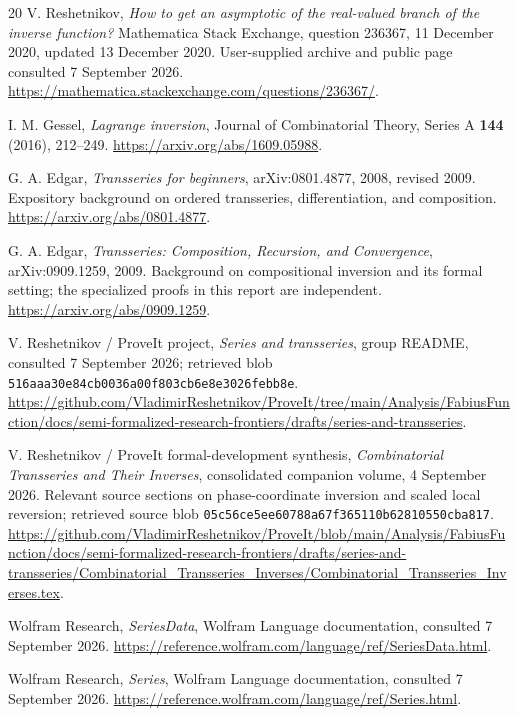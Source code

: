 \documentclass[11pt,a4paper]{article}
\numberwithin{equation}{section}
\theoremstyle{definition}
\theoremstyle{remark}
\begin{document}
\begingroup\small
\begin{thebibliography}{20}
V. Reshetnikov, \emph{How to get an asymptotic of the real-valued branch of
the inverse function?} Mathematica Stack Exchange, question 236367,
11 December 2020, updated 13 December 2020. User-supplied archive and public
page consulted 7 September 2026.
\url{https://mathematica.stackexchange.com/questions/236367/}.

I. M. Gessel, \emph{Lagrange inversion}, Journal of Combinatorial Theory,
Series A \textbf{144} (2016), 212--249.
\url{https://arxiv.org/abs/1609.05988}.

G. A. Edgar, \emph{Transseries for beginners}, arXiv:0801.4877,
2008, revised 2009. Expository background on ordered transseries,
differentiation, and composition.
\url{https://arxiv.org/abs/0801.4877}.

G. A. Edgar, \emph{Transseries: Composition, Recursion, and Convergence},
arXiv:0909.1259, 2009. Background on compositional inversion and its formal
setting; the specialized proofs in this report are independent.
\url{https://arxiv.org/abs/0909.1259}.

V. Reshetnikov / ProveIt project, \emph{Series and transseries}, group README,
consulted 7 September 2026; retrieved blob
\texttt{516aaa30e84cb0036a00f803cb6e8e3026febb8e}.
\url{https://github.com/VladimirReshetnikov/ProveIt/tree/main/Analysis/FabiusFunction/docs/semi-formalized-research-frontiers/drafts/series-and-transseries}.

V. Reshetnikov / ProveIt formal-development synthesis,
\emph{Combinatorial Transseries and Their Inverses}, consolidated companion
volume, 4 September 2026. Relevant source sections on phase-coordinate
inversion and scaled local reversion; retrieved source blob
\texttt{05c56ce5ee60788a67f365110b62810550cba817}.
\url{https://github.com/VladimirReshetnikov/ProveIt/blob/main/Analysis/FabiusFunction/docs/semi-formalized-research-frontiers/drafts/series-and-transseries/Combinatorial_Transseries_Inverses/Combinatorial_Transseries_Inverses.tex}.

Wolfram Research, \emph{SeriesData}, Wolfram Language documentation,
consulted 7 September 2026.
\url{https://reference.wolfram.com/language/ref/SeriesData.html}.

Wolfram Research, \emph{Series}, Wolfram Language documentation,
consulted 7 September 2026.
\url{https://reference.wolfram.com/language/ref/Series.html}.


\end{thebibliography}
\end{document}

